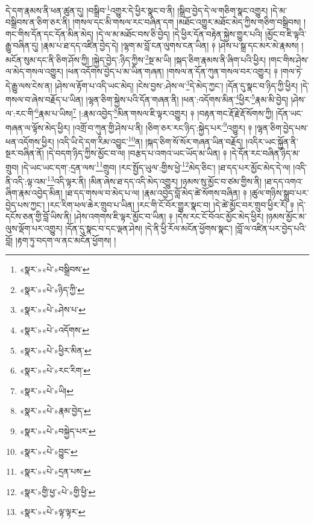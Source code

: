 དེ་དག་རྣམས་ནི་ཕན་ཚུན་དུ། །བསྒྲིབ་\footnote{«སྣར་»«པེ་»བསྒྲིབས་}འགྱུར་དེ་ཕྱིར་སྣང་བ་ནི། །སྒྲིབ་བྱེད་དེ་ལ་གཅིག་སྣང་འགྱུར། །དེ་མ་བསྒྲིབས་ན་ཅིག་ཅར་ནི། །གསལ་དང་མི་གསལ་རང་བཞིན་དག །མཐོང་འགྱུར་མཐོང་མེད་ཀྱིས་གཅིག་བསྒྲིབས། །གང་གིས་དོན་དང་དོན་མིན་མེད། །དེ་ལ་མ་མཐོང་བས་ཅི་བྱེད། །དེ་ཕྱིར་དོན་བརྟེན་སྐྱེས་གྱུར་པའི། །མྱོང་བ་ཇི་ལྟའི་རྒྱུ་བཞིན་དུ། །རྣམ་པ་ཐ་དད་འཛིན་བྱེད་དེ། །ལྷག་མ་བློ་ངན་ལུགས་ངན་ཡིན། ༈ །ཤེས་པ་སྒྲ་དང་མར་མེ་རྣམས། །མངོན་སུམ་དང་ནི་ཅིག་ཤོས་ཀྱི། །སྐྱེད་བྱེད་:ཉིད་ཀྱིས་\footnote{«སྣར་»«པེ་»ཉིད་ཀྱི་}སྔ་མ་ཡི། །སྐད་ཅིག་རྣམས་ནི་ཞིག་པའི་ཕྱིར། །གང་གིས་ཤེས་ལ་མེད་གསལ་འགྱུར། །ཕན་འདོགས་བྱེད་པ་མ་ཡིན་གཞན། །གསལ་ན་དོན་ཀུན་གསལ་བར་འགྱུར། ༈ །གལ་ཏེ་དེ་རྒྱུ་ལས་ངེས་ན། །ཤེས་ལ་རྟོག་པ་འདི་ཡང་མེད། །ངེས་བྱས་:ཤེས་ལ་\footnote{«སྣར་»«པེ་»ཤེས་པ་}དེ་མེད་ཀྱང་། །དོན་དུ་སྣང་བ་ཉིད་ཀྱི་ཕྱིར། །དེ་གསལ་བ་ཞེས་བརྗོད་པ་ཡིན། །ལྷན་ཅིག་སྐྱེས་པའི་དོན་གཞན་ནི། །ཕན་:འདོགས་མིན་\footnote{«སྣར་»«པེ་»འདོགས་}ཕྱིར་\footnote{«སྣར་»«པེ་»ཕྱིར་མིན་}རྣམ་མི་བྱེད། །ཤེས་ལ་:རང་གི་\footnote{«སྣར་»«པེ་»རང་རིག་}རྣམ་པ་ཡིས།\footnote{«སྣར་»«པེ་»ཡི།} །:རྣམ་འབྱེད་\footnote{«སྣར་»«པེ་»རྣམ་བྱེད་}མིན་གསལ་ཇི་ལྟར་འགྱུར། ༈ །བརྟན་གང་རྡོ་རྗེ་རྡོ་སོགས་ཀྱི། །དོན་ཡང་གཞན་ལ་ལྟོས་མེད་ཕྱིར། །འགྲོ་བ་ཀུན་གྱི་ཤེས་པ་ནི། །ཅིག་ཅར་རང་ཉིད་:སྐྱེད་པར་\footnote{«སྣར་»«པེ་»བསྐྱེད་པར་}འགྱུར། ༈ །ལྷན་ཅིག་བྱེད་པས་ཕན་འདོགས་ཕྱིར། །འདི་ཡི་དེ་དག་རིམ་འབྱུང་\footnote{«སྣར་»«པེ་»བྱུང་}ན། །སྐད་ཅིག་སོ་སོར་གཞན་ཡིན་བརྗོད། །འདིར་ཡང་སྐྱོན་ནི་སྔར་བཞིན་ནོ། །དེ་བདག་ཉིད་ཀྱིས་མྱོང་བ་ལ། །བརྩད་པ་འགའ་ཡང་ཡོད་མ་ཡིན། ༈ །དེ་དོན་རང་བཞིན་ཉིད་མ་གྲུབ། །དེ་ཡང་ཡང་དག་:དྲན་ལས་\footnote{«སྣར་»«པེ་»དྲན་པས་}གྲུབ། །རང་སྤྱོད་ཡུལ་:གྱིས་ཕྱེ་\footnote{«སྣར་»གྱི་ཕྱ་«པེ་»གྱི་ཕྱི་}མེད་ཅིང་། །ཐ་དད་པར་མྱོང་མེད་དེ་ལ། །འདི་ནི་འདི་:ལྟ་འམ་\footnote{«སྣར་»«པེ་»ལྟ་ལྟར་}འདི་ལྟར་ནི། །མིན་ཞེས་ཐ་དད་འདི་མེད་འགྱུར། །ཉམས་སུ་མྱོང་བ་ཙམ་གྱིས་ནི། །ཐ་དད་འགའ་ཞིག་རྣམ་འབྱེད་མིན། །ཐ་དད་གསལ་བ་མེད་པ་ལ། །རྣམ་འབྱེད་བློ་མེད་ཚེ་སོགས་བཞིན། ༈ །ཚུལ་གཉིས་སྒྲུབ་པར་བྱེད་པས་ཀྱང་། །རང་རིག་ཕལ་ཆེར་གྲུབ་པ་ཡིན། །རང་གི་ངོ་བོར་གྱུར་སྣང་བ། །དེ་ཚེ་མྱོང་བར་གྲུབ་ཕྱིར་རོ། ༈ །དེ་དངོས་ཅན་གྱི་བློ་ཡིས་ནི། །ཤེས་འགགས་ཇི་ལྟར་མྱོང་བ་ཡིན། ༈ །དེས་རང་ངོ་བོའང་མྱོང་མེད་ཕྱིར། །ཉམས་མྱོང་མ་ལུས་ལྡོག་པར་འགྱུར། །དོན་དུ་སྣང་བ་དང་ལྡན་ཤེས། །དེ་ནི་ཕྱི་རོལ་མངོན་ཕྱོགས་སྣང་། །བློ་ལ་འཛིན་པར་བྱེད་པའི་བློ། །རྟག་ཏུ་བདག་ལ་ནང་མངོན་ཕྱོགས། །
